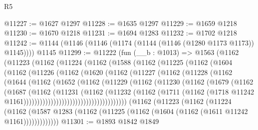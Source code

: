 \begin{lexlean}{R5}
\begin{coremodule}
@11227 := @1627 @1297
@11228 := @1635 @1297
@11229 := @1659 @1218
@11230 := @1670 @1218
@11231 := @1694 @1283
@11232 := @1702 @1218
@11242 := @1144 (@1146 (@1146 (@1174 (@1144 (@1146 (@1280 @1173 @1173)) @1145)))) @1145
@11299 := @11222
    (fun (__b : @1013) =>
    @1563
      (@1162
        (@11223
          (@1162
            (@11224
              (@1162
                (@1588
                  (@1162
                    (@11225
                      (@1162
                        (@1604
                          (@1162
                            (@11226
                              (@1162
                                (@1620
                                  (@1162
                                    (@11227
                                      (@1162
                                        (@11228
                                          (@1162
                                            (@1644
                                              (@1162
                                                (@1652
                                                  (@1162
                                                    (@11229
                                                      (@1162
                                                        (@11230
                                                          (@1162
                                                            (@1679
                                                              (@1162
                                                                (@1687
                                                                  (@1162
                                                                    (@11231
                                                                      (@1162
                                                                        (@11232
                                                                          (@1162
                                                                            (@1711
                                                                              (@1162
                                                                                (@1718
                                                                                  @11242
                                                                                  @1161))))))))))))))))))))))))))))))))))))))
      (@1162
        (@11223
          (@1162
            (@11224
              (@1162
                (@1587 @1283 (@1162 (@11225 (@1162 (@1604 (@1162 (@1611 @11242 @1161)))))))))))))
@11301 := @1893 @1842 @1849

\end{coremodule}
\end{lexlean}
